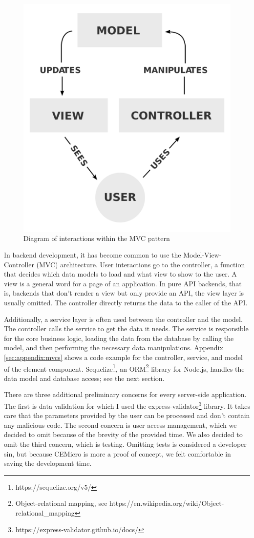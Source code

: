 \begin{figure}[ht]
  \centering
  \includegraphics[width=0.3\linewidth]{assets/mvc-process.png}
  \caption[Diagram of interactions within the MVC pattern]{Diagram of interactions within the MVC pattern ~\cite{mvc.wiki}}
  \label{fig:mvc-process}
\end{figure}

In backend development, it has become common to use the Model-View-Controller (MVC) architecture. User interactions go to the controller, a function that decides which data models to load and what view to show to the user. A view is a general word for a page of an application. In pure API backends, that is, backends that don't render a view but only provide an API, the view layer is usually omitted. The controller directly returns the data to the caller of the API.

Additionally, a service layer is often used between the controller and the model. The controller calls the service to get the data it needs. The service is responsible for the core business logic, loading the data from the database by calling the model, and then performing the necessary data manipulations. Appendix \ref{sec:appendix:mvcs} shows a code example for the controller, service, and model of the element component. Sequelize\footnote{https://sequelize.org/v5/}, an ORM\footnote{Object-relational mapping, see https://en.wikipedia.org/wiki/Object-relational_mapping} library for Node.js, handles the data model and database access; see the next section.

There are three additional preliminary concerns for every server-side application. The first is data validation for which I used the express-validator\footnote{https://express-validator.github.io/docs/} library. It takes care that the parameters provided by the user can be processed and don't contain any malicious code. The second concern is user access management, which we decided to omit because of the brevity of the provided time. We also decided to omit the third concern, which is testing. Omitting tests is considered a developer sin, but because CEMicro is more a proof of concept, we felt comfortable in saving the development time.

